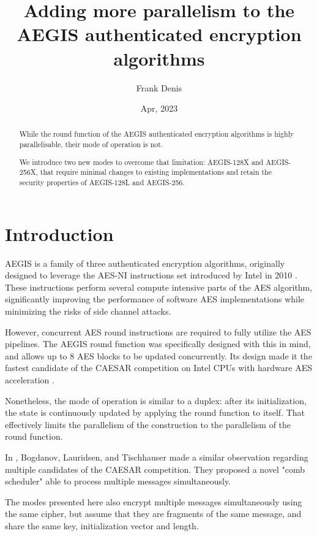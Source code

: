\documentclass[envcountsame,runningheads,notitlepage]{llncs}
\title{Adding more parallelism to the AEGIS authenticated encryption algorithms}
\date{Apr, 2023}
\author{
  Frank Denis\inst{}
}
\institute{Fastly Inc.\\
  \href{mailto:fde@00f.net}{fde@00f.net}
}
\author{}
\institute{}
\begin{document}
\maketitle

\markboth{}{}

\begin{abstract}
  While the round function of the AEGIS authenticated encryption algorithms is highly parallelisable, their mode of operation is not.

  We introduce two new modes to overcome that limitation: AEGIS-128X and AEGIS-256X, that require minimal changes to existing implementations and retain the security properties of AEGIS-128L and AEGIS-256.
\end{abstract}

\section{Introduction}
\label{sec:introduction}

AEGIS \cite{SAC:WuPre13} is a family of three authenticated encryption algorithms, originally designed to leverage the AES-NI instructions set introduced by Intel in 2010 \cite{Akdemir2010BreakthroughAP}.
These instructions perform several compute intensive parts of the AES algorithm, significantly improving the performance of software AES implementations while minimizing the risks of side channel attacks.

However, concurrent AES round instructions are required to fully utilize the AES pipelines. The AEGIS round function was specifically designed with this in mind, and allows up to 8 AES blocks to be updated concurrently. Its design made it the fastest candidate of the CAESAR competition on Intel CPUs with hardware AES acceleration \cite{EPRINT:ARAR16}.

Nonetheless, the mode of operation is similar to a duplex: after its initialization, the state is continuously updated by applying the round function to itself.
That effectively limits the parallelism of the construction to the parallelism of the round function.

In \cite{FSE:BogLauTis15}, Bogdanov, Lauridsen, and Tischhauser made a similar observation regarding multiple candidates of the CAESAR competition. They proposed a novel "comb scheduler" able to process multiple messages simultaneously.

The modes presented here also encrypt multiple messages simultaneously using the same cipher, but assume that they are fragments of the same message, and share the same key, initialization vector and length.
\end{document}
